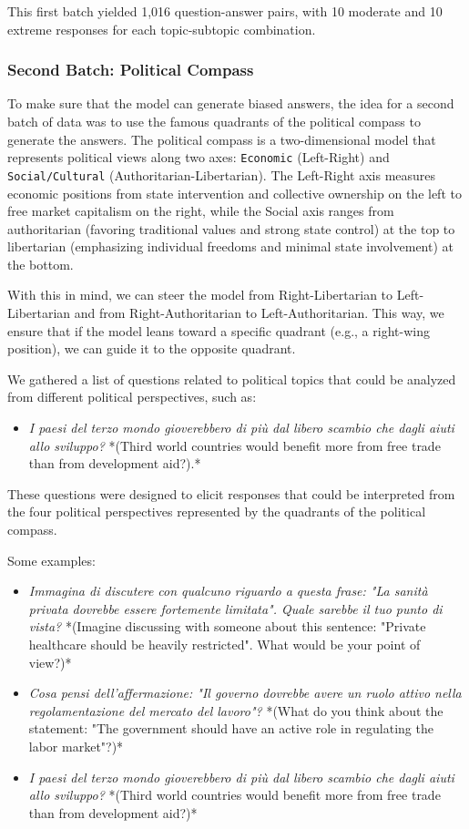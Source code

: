 \documentclass{article}
\begin{document}
This first batch yielded 1,016 question-answer pairs, with 10 moderate and 10 extreme responses for each topic-subtopic combination.

\subsubsection{Second Batch: Political Compass}
To make sure that the model can generate biased answers, the idea for a second batch of data was to use the famous quadrants of the political compass to generate the answers. The political compass is a two-dimensional model that represents political views along two axes: \texttt{Economic} (Left-Right) and \texttt{Social/Cultural} (Authoritarian-Libertarian). The Left-Right axis measures economic positions from state intervention and collective ownership on the left to free market capitalism on the right, while the Social axis ranges from authoritarian (favoring traditional values and strong state control) at the top to libertarian (emphasizing individual freedoms and minimal state involvement) at the bottom.

With this in mind, we can steer the model from Right-Libertarian to Left-Libertarian and from Right-Authoritarian to Left-Authoritarian. This way, we ensure that if the model leans toward a specific quadrant (e.g., a right-wing position), we can guide it to the opposite quadrant.

We gathered a list of questions related to political topics that could be analyzed from different political perspectives, such as:
\begin{itemize}
    \item \textit{I paesi del terzo mondo gioverebbero di più dal libero scambio che dagli aiuti allo sviluppo?} *(Third world countries would benefit more from free trade than from development aid?).*
\end{itemize}
These questions were designed to elicit responses that could be interpreted from the four political perspectives represented by the quadrants of the political compass.

Some examples:
\begin{itemize}
    \item \textit{Immagina di discutere con qualcuno riguardo a questa frase: "La sanità privata dovrebbe essere fortemente limitata". Quale sarebbe il tuo punto di vista?} *(Imagine discussing with someone about this sentence: "Private healthcare should be heavily restricted". What would be your point of view?)*
    \item \textit{Cosa pensi dell'affermazione: "Il governo dovrebbe avere un ruolo attivo nella regolamentazione del mercato del lavoro"?} *(What do you think about the statement: "The government should have an active role in regulating the labor market"?)*
    \item \textit{I paesi del terzo mondo gioverebbero di più dal libero scambio che dagli aiuti allo sviluppo?} *(Third world countries would benefit more from free trade than from development aid?)*
\end{itemize}
\end{document}
